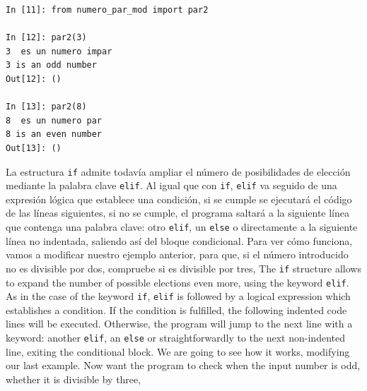 \begin{center}
    \begin{minipage}{.5\textwidth}
\begin{verbatim}
In [11]: from numero_par_mod import par2

In [12]: par2(3)
3  es un numero impar
3 is an odd number
Out[12]: ()

In [13]: par2(8)
8  es un numero par
8 is an even number
Out[13]: ()
\end{verbatim}
\end{minipage}
\end{center}
    
\begin{paracol}{2}
La estructura \texttt{if} admite todavía ampliar el número de posibilidades de elección mediante la palabra clave \texttt{elif}. Al igual que  con \texttt{if}, \texttt{elif} va seguido de una expresión lógica que establece una condición, si se cumple se ejecutará el código de las líneas siguientes, si no se cumple, el programa saltará a la siguiente línea que contenga una palabra clave: otro \texttt{elif}, un \texttt{else} o directamente a la siguiente línea no indentada, saliendo así del bloque condicional. Para ver cómo funciona, vamos a modificar nuestro ejemplo anterior, para que, si el número introducido no es divisible por dos, compruebe si es divisible por tres,
\switchcolumn
The \texttt{if} structure allows to expand the number of possible elections even more, using the keyword \texttt{elif}. As in the case of the keyword \texttt{if}, \texttt{elif} is followed by a logical expression which establishes a condition. If the condition is fulfilled, the following indented code lines will be executed. Otherwise, the program will jump to the next line with a keyword: another \texttt{elif}, an \texttt{else} or straightforwardly to the next non-indented line, exiting the conditional block. We are going to see how it works, modifying our last example. Now want the program to check when the input number is odd, whether it is divisible by three, 
\end{paracol}

